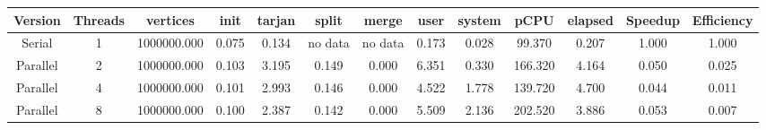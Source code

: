 \begin{tabular}{|c|c|c|c|c|c|c|c|c|c|c|c|c|}
\toprule
 Version &  Threads &    vertices &  init &  tarjan &   split &   merge &  user &  system &    pCPU &  elapsed &  Speedup &  Efficiency \\
\midrule
  Serial &        1 & 1000000.000 & 0.075 &   0.134 & no data & no data & 0.173 &   0.028 &  99.370 &    0.207 &    1.000 &       1.000 \\
Parallel &        2 & 1000000.000 & 0.103 &   3.195 &   0.149 &   0.000 & 6.351 &   0.330 & 166.320 &    4.164 &    0.050 &       0.025 \\
Parallel &        4 & 1000000.000 & 0.101 &   2.993 &   0.146 &   0.000 & 4.522 &   1.778 & 139.720 &    4.700 &    0.044 &       0.011 \\
Parallel &        8 & 1000000.000 & 0.100 &   2.387 &   0.142 &   0.000 & 5.509 &   2.136 & 202.520 &    3.886 &    0.053 &       0.007 \\
\bottomrule
\end{tabular}

